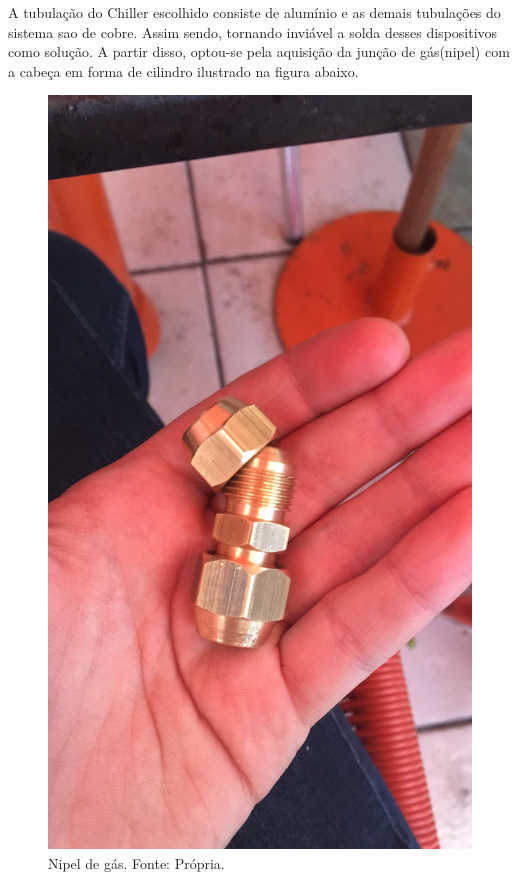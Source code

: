                 A tubulação do Chiller escolhido consiste de alumínio e as demais tubulações
                do sistema sao de cobre. Assim sendo, tornando inviável a solda desses dispositivos
                como solução. A partir disso, optou-se pela aquisição da junção de gás(nipel) com a
                cabeça em forma de cilindro ilustrado na figura abaixo.

                \begin{figure}[!htb]
                    \centering
                    \includegraphics[scale= 0.2]{figuras/nipel-gas.png}
                    \caption{Nipel de gás. Fonte: Própria.}
                    \label{nipel-gas}
                \end{figure}

